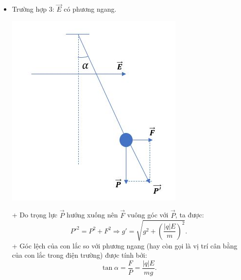 \begin{itemize}
	\item Trường hợp 3: $\vec{E}$ có phương ngang.
	\begin{center}
		\includegraphics[scale=0.8]{../figs/VN12-PH-04-A-003-3-V2-1.JPG}
	\end{center}
	+ Do trọng lực $\vec P$ hướng xuống nên $\vec{F}$ vuông góc với $\vec{P}$, ta được:
	\begin{equation*}
		P'^2 =P^2+F^2 \Rightarrow g'=\sqrt{g^2 + (\dfrac{|q|E}{m})^2}.
	\end{equation*}
	+ Góc lệch của con lắc so với phương ngang (hay còn gọi là vị trí cân bằng của con lắc trong điện trường) được tính bởi:
	\begin{equation*}
		\tan \alpha =\dfrac{F}{P} = \dfrac{|q|E}{mg}.
	\end{equation*}
\end{itemize}
